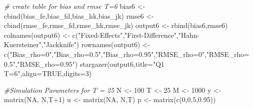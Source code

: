 \documentclass[
]{article}
\newenvironment{Shaded}{\begin{snugshade}}{\end{snugshade}}
\newcommand{\AttributeTok}[1]{\textcolor[rgb]{0.77,0.63,0.00}{#1}}
\newcommand{\CommentTok}[1]{\textcolor[rgb]{0.56,0.35,0.01}{\textit{#1}}}
\newcommand{\ConstantTok}[1]{\textcolor[rgb]{0.00,0.00,0.00}{#1}}
\newcommand{\DecValTok}[1]{\textcolor[rgb]{0.00,0.00,0.81}{#1}}
\newcommand{\FloatTok}[1]{\textcolor[rgb]{0.00,0.00,0.81}{#1}}
\newcommand{\FunctionTok}[1]{\textcolor[rgb]{0.00,0.00,0.00}{#1}}
\newcommand{\NormalTok}[1]{#1}
\newcommand{\OtherTok}[1]{\textcolor[rgb]{0.56,0.35,0.01}{#1}}
\newcommand{\SpecialCharTok}[1]{\textcolor[rgb]{0.00,0.00,0.00}{#1}}
\newcommand{\StringTok}[1]{\textcolor[rgb]{0.31,0.60,0.02}{#1}}
\begin{document}
\begin{Shaded}
\begin{Highlighting}[]
\CommentTok{\# create table for bias and rmse T=6}
\NormalTok{bias6 }\OtherTok{\textless{}{-}} \FunctionTok{cbind}\NormalTok{(bias\_fe,bias\_fd,bias\_hk,bias\_jk)}
\NormalTok{rmse6 }\OtherTok{\textless{}{-}} \FunctionTok{cbind}\NormalTok{(rmse\_fe,rmse\_fd,rmse\_hk,rmse\_jk)}
\NormalTok{output6 }\OtherTok{\textless{}{-}} \FunctionTok{rbind}\NormalTok{(bias6,rmse6)}
\FunctionTok{colnames}\NormalTok{(output6) }\OtherTok{\textless{}{-}} \FunctionTok{c}\NormalTok{(}\StringTok{"Fixed{-}Effects"}\NormalTok{,}\StringTok{"First{-}Difference"}\NormalTok{,}\StringTok{"Hahn{-}Kuersteiner"}\NormalTok{,}\StringTok{"Jackknife"}\NormalTok{)}
\FunctionTok{rownames}\NormalTok{(output6) }\OtherTok{\textless{}{-}} \FunctionTok{c}\NormalTok{(}\StringTok{"Bias\_rho=0"}\NormalTok{,}\StringTok{"Bias\_rho=0.5"}\NormalTok{,}\StringTok{"Bias\_rho=0.95"}\NormalTok{,}\StringTok{"RMSE\_rho=0"}\NormalTok{,}\StringTok{"RMSE\_rho=0.5"}\NormalTok{,}\StringTok{"RMSE\_rho=0.95"}\NormalTok{)}
\FunctionTok{stargazer}\NormalTok{(output6,}\AttributeTok{title=}\StringTok{"Q1 T=6"}\NormalTok{,}\AttributeTok{align=}\ConstantTok{TRUE}\NormalTok{,}\AttributeTok{digits=}\DecValTok{3}\NormalTok{)}

\CommentTok{\#Simulation Parameters for T = 25}
\NormalTok{N }\OtherTok{\textless{}{-}} \DecValTok{100}
\NormalTok{T }\OtherTok{\textless{}{-}} \DecValTok{25}
\NormalTok{M }\OtherTok{\textless{}{-}} \DecValTok{1000}
\NormalTok{y }\OtherTok{\textless{}{-}} \FunctionTok{matrix}\NormalTok{(}\ConstantTok{NA}\NormalTok{, N,T}\SpecialCharTok{+}\DecValTok{1}\NormalTok{)}
\NormalTok{u }\OtherTok{\textless{}{-}} \FunctionTok{matrix}\NormalTok{(}\ConstantTok{NA}\NormalTok{, N,T)}
\NormalTok{p }\OtherTok{\textless{}{-}} \FunctionTok{matrix}\NormalTok{(}\FunctionTok{c}\NormalTok{(}\DecValTok{0}\NormalTok{,}\FloatTok{0.5}\NormalTok{,}\FloatTok{0.95}\NormalTok{))}


\end{Highlighting}
\end{Shaded}
\end{document}
